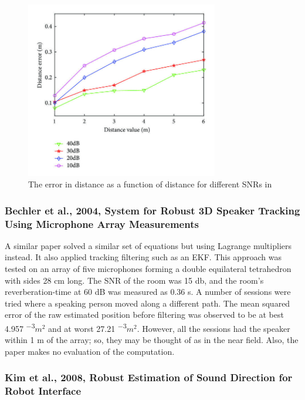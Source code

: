 \documentclass[notitlepage]{report}
\newcommand{\e}[1]{\times 10^{#1}}
\begin{document}
\begin{figure}[H]
\includegraphics[width=0.75\textwidth]{./chen_2019/distance_SNR.jpg}
\centering
\caption{The error in distance as a function of distance for different SNRs in \cite{chen_sound_2019}}
\label{fig:chen_2019_distance_SNR}
\centering
\end{figure}

\subsubsection{Bechler et al., 2004, System for Robust 3D Speaker Tracking Using Microphone Array Measurements}

A similar paper \cite{bechler_system_2004} solved a similar set of equations but using Lagrange multipliers instead. It also applied tracking filtering such as an EKF. This approach was tested on an array of five microphones forming a double equilateral tetrahedron with sides 28 \si{cm} long. The SNR of the room was 15 \si{db}, and the room's reverberation-time at 60 \si{dB} was measured as 0.36 \si{s}. A number of sessions were tried where a speaking person moved along a different path. The mean squared error of the raw estimated position before filtering was observed to be at best 4.957 \si{\e{-3}}{$m^2$} and at worst 27.21 \si{\e{-3}}{$m^2$}. However, all the sessions had the speaker within 1 \si{m} of the array; so, they may be thought of as in the near field. Also, the paper makes no evaluation of the computation.

\subsubsection{Kim et al., 2008, Robust Estimation of Sound Direction for Robot Interface}
\end{document}
